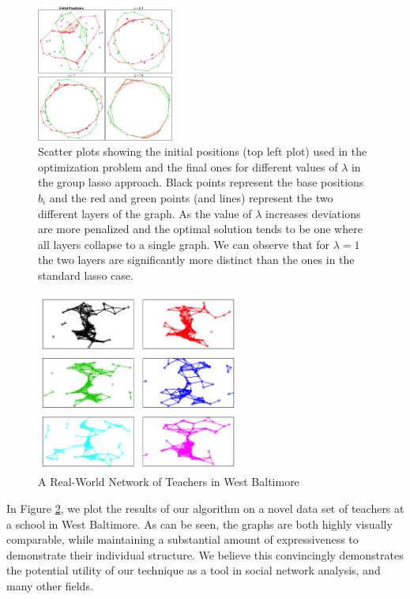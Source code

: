 \documentclass{article}
\begin{document}
\begin{figure}[h!]
   \centering
   \includegraphics[width=0.4\textwidth]{plot_positions_group} %
   \caption{Scatter plots showing the initial positions (top left plot) used in the optimization problem and the final ones for different values of $\lambda$ in the group lasso approach. Black points represent the base positions $b_i$ and the red and green points (and lines) represent the two different layers of the graph. As the value of $\lambda$ increases deviations are more penalized and the optimal solution tends to be one where all layers collapse to a single graph. We can observe that for $\lambda=1$ the two layers are significantly more distinct than the ones in the standard lasso case.}
   \label{fig:pos_group}
\end{figure}

\begin{figure}[h!]
	\centering
	\includegraphics[width=0.6\textwidth]{six_gsa_graphs}
	\caption{A Real-World Network of Teachers in West Baltimore}
	\label{fig:gsa}
\end{figure}

In Figure \ref{fig:gsa}, we plot the results of our algorithm on a novel data set of teachers at a school in West Baltimore. As can be seen, the graphs are both highly visually comparable, while maintaining a substantial amount of expressiveness to demonstrate their individual structure. We believe this convincingly demonstrates the potential utility of our technique as a tool in social network analysis, and many other fields.
\end{document}
